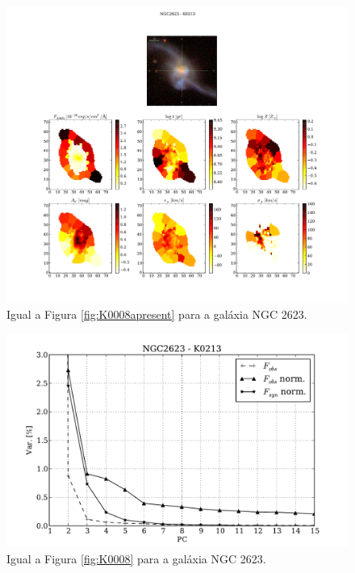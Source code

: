 \begin{figure}
    \includegraphics[width=1.\textwidth]{figuras/K0213-apresent.pdf}
    \caption[Propriedades f\'isicas da gal\'axia NGC 2623.]
    {Igual a Figura \ref{fig:K0008apresent} para a galáxia NGC 2623.}
    \label{fig:K0213apresent}
\end{figure}

\begin{figure}
    \includegraphics[height=0.33\textheight]{figuras/K0213-screetest.pdf}
    \caption[Scree test comparativo entre 3 PCAs - NGC 2623.]
    {Igual a Figura \ref{fig:K0008} para a galáxia NGC 2623.}
    \label{fig:K0213scree}
\end{figure}

